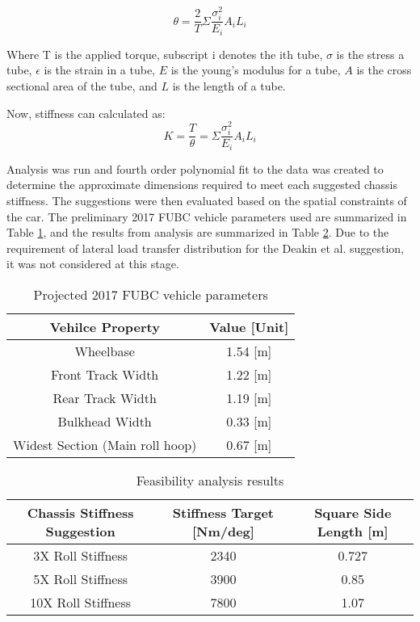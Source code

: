 \documentclass[a4paper]{article}
\numberwithin{equation}{section}
\begin{document}
\begin{equation}
\theta = \frac{2}{T}\Sigma\frac{\sigma_i^2}{E_i}A_i L_i
\end{equation}

Where T is the applied torque, subscript i denotes the ith tube, $\sigma$ is the stress a tube, $\epsilon$ is the strain in a tube, $E$ is the young’s modulus for a tube, $A$ is the cross sectional area of the tube, and $L$ is the length of a tube.

Now, stiffness can calculated as:
\begin{equation}
K=\frac{T}{\theta} = \Sigma\frac{\sigma_i^2}{E_i} A_i L_i
\end{equation}

Analysis was run and fourth order polynomial fit to the data was created to determine the approximate dimensions required to meet each suggested chassis stiffness. The suggestions were then evaluated based on the spatial constraints of the car. The preliminary 2017 FUBC vehicle parameters used are summarized in Table \ref{table:projVehicleParams}, and the results from analysis are summarized in Table \ref{table:Feasibility analysis results}. Due to the requirement of lateral load transfer distribution for the Deakin et al. suggestion, it was not considered at this stage.


\begin{table}[H]
	\begin{center}
		\begin{tabular}{|c|c|}
			\hline
			Vehilce Property & Value [Unit]\\
			\hline
			Wheelbase & 1.54 [m]\\
			\hline
			Front Track Width &1.22 [m]\\
			\hline
			Rear Track Width & 1.19 [m]\\
			\hline
			Bulkhead Width & 0.33 [m]\\
			\hline
			Widest Section (Main roll hoop) & 0.67 [m]\\
			\hline
		\end{tabular}
		\caption{Projected 2017 FUBC vehicle parameters}
		\label{table:projVehicleParams}
	\end{center}
\end{table}

\begin{table}[H]
	\begin{center}
		\begin{tabular}{|c|c|c|}
			\hline
			Chassis Stiffness Suggestion & Stiffness Target [Nm/deg] & Square Side Length [m]\\
			\hline
			3X Roll Stiffness & 2340 & 0.727\\
			\hline
			5X Roll Stiffness & 3900 & 0.85\\
			\hline
			10X Roll Stiffness & 7800 & 1.07\\
			\hline
		\end{tabular}
		\caption{Feasibility analysis results}
		\label{table:Feasibility analysis results}
	\end{center}
\end{table}
\end{document}
